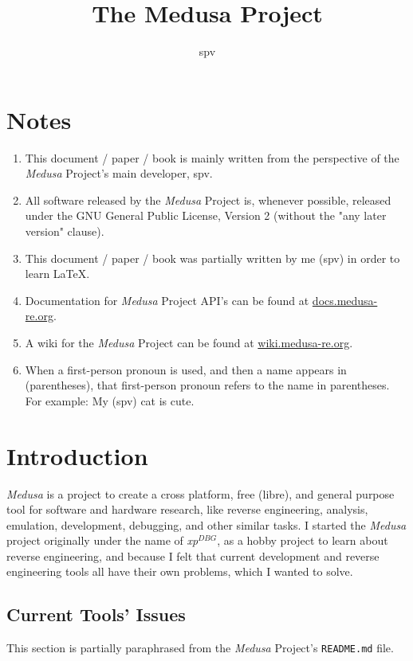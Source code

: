 \documentclass{report}
\title{The Medusa Project}
\author{spv}
\newcommand{\xpDBG}{\textit{xp$^{DBG}$}\xspace}
\begin{document}
	\maketitle

	\chapter{Notes}
	\begin{enumerate}
		\item This document / paper / book is mainly written from the
		perspective of the \textit{Medusa} Project's main developer, spv.

		\item All software released by the \textit{Medusa} Project is, whenever
		possible, released under the GNU General Public License, Version 2
		(without the "any later version" clause).

		\item This document / paper / book was partially written by me (spv) in
		order to learn \LaTeX.

		\item Documentation for \textit{Medusa} Project API's can be found at
		\href{https://docs.medusa-re.org}{docs.medusa-re.org}.

		\item A wiki for the \textit{Medusa} Project can be found at
		\href{https://wiki.medusa-re.org}{wiki.medusa-re.org}.

		\item When a first-person pronoun is used, and then a name appears in
		(parentheses), that first-person pronoun refers to the name in
		parentheses. For example: My (spv) cat is cute.
	\end{enumerate}

	\chapter{Introduction}
	\textit{Medusa} is a project to create a cross platform, free (libre), and
	general purpose tool for software and hardware research, like reverse
	engineering, analysis, emulation, development, debugging, and other similar
	tasks. I started the \textit{Medusa} project originally under the name of
	\xpDBG, as a hobby project to learn about reverse engineering, and because I
	felt that current development and reverse engineering tools all have their
	own problems, which I wanted to solve.

	\section{Current Tools' Issues}
	This section is partially paraphrased from the \textit{Medusa} Project's
	\texttt{README.md} file.
\end{document}
